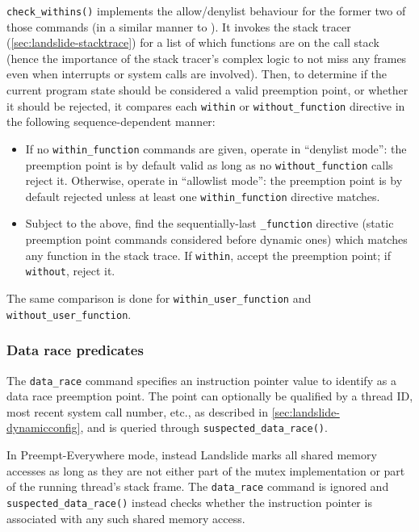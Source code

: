 {\tt check\_withins()} implements the allow/denylist behaviour for the former two of those commands
(in a similar manner to  \cite{sealing}).
It invokes the stack tracer (\cref{sec:landslide-stacktrace})
for a list of which functions are on the call stack
(hence the importance of the stack tracer's complex logic to not miss any frames
even when interrupts or system calls are involved).
Then, to determine if the current program state should be considered a valid preemption point,
or whether it should be rejected,
it compares each {\tt within} or {\tt without\_function} directive in the following sequence-dependent manner:

\begin{itemize}
	\item If no {\tt within\_function} commands are given, operate in ``denylist mode'':
		the preemption point is by default valid as long as no {\tt without\_function} calls reject it.
		Otherwise, operate in ``allowlist mode'':
		the preemption point is by default rejected unless at least one {\tt within\_function} directive matches.
	\item Subject to the above, find the sequentially-last {\tt *\_function} directive
		(static preemption point commands considered before dynamic ones)
		which matches any function in the stack trace.
		If {\tt within}, accept the preemption point; if {\tt without}, reject it.
\end{itemize}

The same comparison is done for {\tt within\_user\_function} and {\tt without\_user\_function}.

\subsubsection{Data race predicates}

The {\tt data\_race} command specifies an instruction pointer value to identify as a data race preemption point.
The point can optionally be qualified by a thread ID, most recent system call number, etc.,
as described in \cref{sec:landslide-dynamicconfig},
and is queried through {\tt suspected\_data\_race()}.

In Preempt-Everywhere mode, instead Landslide marks all shared memory accesses
as long as they are not either part of the mutex implementation or part of the running thread's stack frame.
The {\tt data\_race} command is ignored and {\tt suspected\_data\_race()}
instead checks whether the instruction pointer is associated with any such shared memory access.

